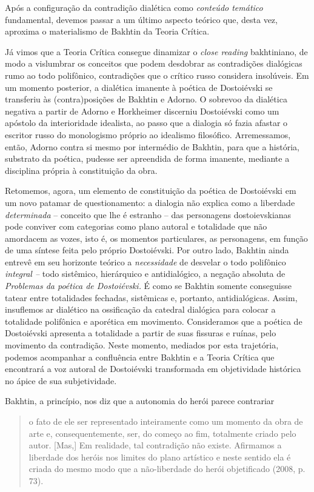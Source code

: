 Após a configuração da contradição dialética como \emph{conteúdo
temático} fundamental, devemos passar a um último aspecto teórico que,
desta vez, aproxima o materialismo de Bakhtin da Teoria Crítica.

Já vimos que a Teoria Crítica consegue dinamizar o \emph{close reading}
bakhtiniano, de modo a vislumbrar os conceitos que podem desdobrar as
contradições dialógicas rumo ao todo polifônico, contradições que o
crítico russo considera insolúveis. Em um momento posterior, a dialética
imanente à poética de Dostoiévski se transferiu às (contra)posições de
Bakhtin e Adorno. O sobrevoo da dialética negativa a partir de Adorno e
Horkheimer discerniu Dostoiévski como um apóstolo da interioridade
idealista, ao passo que a dialogia só fazia afastar o escritor russo do
monologismo próprio ao idealismo filosófico. Arremessamos, então, Adorno
contra si mesmo por intermédio de Bakhtin, para que a história,
substrato da poética, pudesse ser apreendida de forma imanente, mediante
a disciplina própria à constituição da obra.

Retomemos, agora, um elemento de constituição da poética de Dostoiévski
em um novo patamar de questionamento: a dialogia não explica como a
liberdade \emph{determinada} -- conceito que lhe é estranho -- das
personagens dostoievskianas pode conviver com categorias como plano
autoral e totalidade que não amordacem as vozes, isto é, os momentos
particulares, as personagens, em função de uma síntese feita pelo
próprio Dostoiévski. Por outro lado, Bakhtin ainda entrevê em seu
horizonte teórico a \emph{necessidade} de desvelar o todo polifônico
\emph{integral --} todo sistêmico, hierárquico e antidialógico, a
negação absoluta de \emph{Problemas da poética de Dostoiévski.} É como
se Bakhtin somente conseguisse tatear entre totalidades fechadas,
sistêmicas e, portanto, antidialógicas. Assim, insuflemos ar dialético
na ossificação da catedral dialógica para colocar a totalidade
polifônica e aporética em movimento. Consideramos que a poética de
Dostoiévski apresenta a totalidade a partir de suas fissuras e ruínas,
pelo movimento da contradição. Neste momento, mediados por esta
trajetória, podemos acompanhar a confluência entre Bakhtin e a Teoria
Crítica que encontrará a voz autoral de Dostoiévski transformada em
objetividade histórica no ápice de sua subjetividade.

Bakhtin, a princípio, nos diz que a autonomia do herói parece contrariar

\begin{quote}
o fato de ele ser representado inteiramente como um momento da obra de
arte e, consequentemente, ser, do começo ao fim, totalmente criado pelo
autor. {[}Mas,{]} Em realidade, tal contradição não existe. Afirmamos a
liberdade dos heróis nos limites do plano artístico e neste sentido ela
é criada do mesmo modo que a não-liberdade do herói objetificado (2008,
p. 73).
\end{quote}

